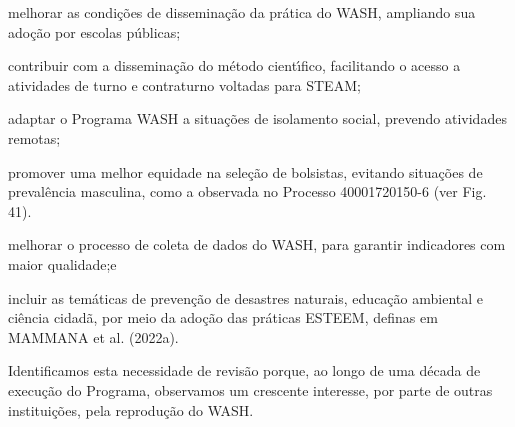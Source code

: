 \documentclass[
12pt,		%
openright,	%
twoside,  %
a4paper,			%
chapter=TITLE,		%
english,			%
french,				%
spanish,			%
brazil				%
]{USPSC-classe/USPSC}
\begin{document}
\begin{alineas}
\item melhorar as condi\c{c}\~oes de dissemina\c{c}\~ao da pr\'atica do WASH, ampliando sua ado\c{c}\~ao por escolas p\'ublicas;
\item contribuir com a dissemina\c{c}\~ao do m\'etodo cient\'{\i}fico, facilitando o acesso a atividades de turno e contraturno voltadas para STEAM;
\item adaptar o Programa WASH a situa\c{c}\~oes de isolamento social, prevendo atividades remotas;
\item promover uma melhor equidade na sele\c{c}\~ao de bolsistas, evitando situa\c{c}\~oes de preval\^encia masculina, como a observada no Processo 40001720150-6 (ver Fig. 41).
\item melhorar o processo de coleta de dados do WASH, para garantir indicadores com maior qualidade;e
\item incluir as tem\'aticas de preven\c{c}\~ao de desastres naturais, educa\c{c}\~ao ambiental e ci\^encia cidad\~a, por meio da ado\c{c}\~ao das pr\'aticas ESTEEM, definas em  MAMMANA et al. (2022a).
\end{alineas}

Identificamos esta necessidade de revis\~ao porque, ao longo de uma d\'ecada de execu\c{c}\~ao do Programa, observamos um crescente interesse, por parte de outras institui\c{c}\~oes, pela reprodu\c{c}\~ao do WASH.
\end{document}
